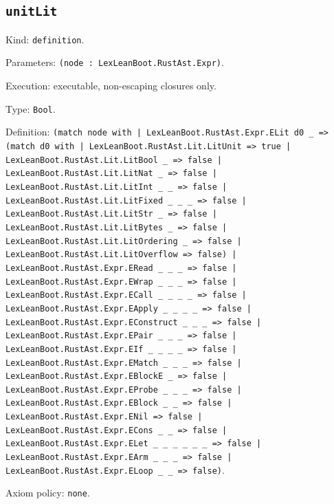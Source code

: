 \documentclass[11pt]{article}
\begin{document}
\subsection*{\texttt{unitLit}}
\noindent Kind: \texttt{definition}.\par
\noindent Parameters: \texttt{(node : LexLeanBoot.RustAst.Expr)}.\par
\noindent Execution: executable, non-escaping closures only.\par
\noindent Type: \texttt{Bool}.\par
\noindent Definition: \texttt{(match node with | LexLeanBoot.RustAst.Expr.ELit d0 \_ => (match d0 with | LexLeanBoot.RustAst.Lit.LitUnit => true | LexLeanBoot.RustAst.Lit.LitBool \_ => false | LexLeanBoot.RustAst.Lit.LitNat \_ => false | LexLeanBoot.RustAst.Lit.LitInt \_ \_ => false | LexLeanBoot.RustAst.Lit.LitFixed \_ \_ \_ => false | LexLeanBoot.RustAst.Lit.LitStr \_ => false | LexLeanBoot.RustAst.Lit.LitBytes \_ => false | LexLeanBoot.RustAst.Lit.LitOrdering \_ => false | LexLeanBoot.RustAst.Lit.LitOverflow => false) | LexLeanBoot.RustAst.Expr.ERead \_ \_ \_ => false | LexLeanBoot.RustAst.Expr.EWrap \_ \_ \_ => false | LexLeanBoot.RustAst.Expr.ECall \_ \_ \_ \_ => false | LexLeanBoot.RustAst.Expr.EApply \_ \_ \_ \_ => false | LexLeanBoot.RustAst.Expr.EConstruct \_ \_ \_ => false | LexLeanBoot.RustAst.Expr.EPair \_ \_ \_ => false | LexLeanBoot.RustAst.Expr.EIf \_ \_ \_ \_ => false | LexLeanBoot.RustAst.Expr.EMatch \_ \_ \_ => false | LexLeanBoot.RustAst.Expr.EBlockE \_ => false | LexLeanBoot.RustAst.Expr.EProbe \_ \_ \_ => false | LexLeanBoot.RustAst.Expr.EBlock \_ \_ => false | LexLeanBoot.RustAst.Expr.ENil => false | LexLeanBoot.RustAst.Expr.ECons \_ \_ => false | LexLeanBoot.RustAst.Expr.ELet \_ \_ \_ \_ \_ \_ => false | LexLeanBoot.RustAst.Expr.EArm \_ \_ \_ => false | LexLeanBoot.RustAst.Expr.ELoop \_ \_ => false)}.\par
\noindent Axiom policy: \texttt{none}.\par
\end{document}
